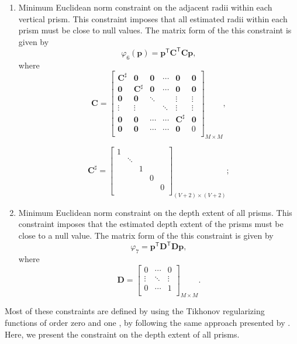 \begin{enumerate}
\item Minimum Euclidean norm constraint on the adjacent radii within each vertical prism. This constraint imposes that all estimated radii within each prism must be close to null values. The matrix form of the this constraint is given by
\begin{equation}
\varphi_{6}(\textbf{p}) = \textbf{p}^\mathsf{T}\textbf{C}^\mathsf{T}\textbf{C}\textbf{p},
\end{equation}
where
\begin{equation}
\textbf{C} = 
\begin{bmatrix}
\textbf{C}^{\sharp} & \mathbf{0} & \mathbf{0} & \cdots & \mathbf{0} & \mathbf{0}\\
\mathbf{0} & \textbf{C}^{\sharp} &  \mathbf{0} & \cdots & \mathbf{0} & \mathbf{0}\\
\mathbf{0} & \mathbf{0} & \ddots & & \vdots & \vdots\\
\vdots & \vdots & & \ddots & \vdots & \vdots\\
\mathbf{0} & \mathbf{0} &  \cdots & \cdots & \textbf{C}^{\sharp} & \mathbf{0}\\
\mathbf{0} & \mathbf{0} &  \cdots &  \cdots & \mathbf{0} & 0\\
\end{bmatrix}_{M\times M} ,
\end{equation}

\begin{equation}
\textbf{C}^{\sharp} = 
\begin{bmatrix}
1 & & & & \\
& \ddots &  & &  \\
&  & 1 & & \\
&  & & 0 &  \\
&  & & & 0 \\
\end{bmatrix}_{(V+2)\times (V+2)};
\end{equation}

\item Minimum Euclidean norm constraint on the depth extent of all prisms. This constraint imposes that the estimated depth extent of the prisms must be close to a null value. The matrix form of the this constraint is given by
\begin{equation}\label{eq:phi7}
\varphi_7 = \mathbf{p}^\mathsf{T}\mathbf{D}^\mathsf{T}\mathbf{D}\mathbf{p},
\end{equation}
where
\begin{equation}
\mathbf{D} =
\begin{bmatrix}
 0 & \cdots  & 0 \\
 \vdots & \ddots & \vdots\\
 0  & \cdots  & 1\\
\end{bmatrix}_{M\times M}.
\end{equation}

\end{enumerate}

Most of these constraints are defined by using the Tikhonov regularizing functions of order zero and one \citep{aster-etal2019}, by following the same approach presented by \citet{oliveirajr-etal2011}. Here, we present the constraint on the depth extent of all prisms.